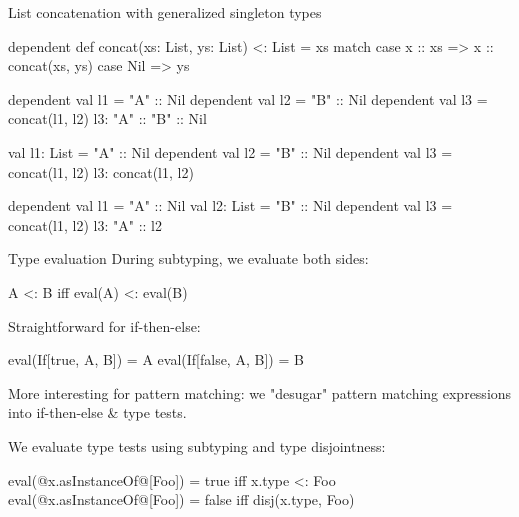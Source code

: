 \documentclass[10pt]{beamer}
\newenvironment{slide}[2][]
  {\begin{frame}[fragile,environment=slide,#1]{#2}}
  {\end{frame}}
\newcommand{\tp}{\color{typeColor}}
\begin{document}
\begin{slide}{List concatenation with generalized singleton types}
\begin{code}
dependent def concat(xs: List, ys: List) <: List =
  xs match
    case x :: xs => x :: concat(xs, ys)
    case Nil => ys
\end{code}
\pause
\begin{overprint}
\begin{code}
dependent val l1 = "A" :: Nil
dependent val l2 = "B" :: Nil
dependent val l3 = concat(l1, l2)
l3: { "A" :: "B" :: Nil }
\end{code}

\begin{code}
val l1: List     = "A" :: Nil
dependent val l2 = "B" :: Nil
dependent val l3 = concat(l1, l2)
l3: { concat(l1, l2) }
\end{code}

\begin{code}
dependent val l1 = "A" :: Nil
val l2: List     = "B" :: Nil
dependent val l3 = concat(l1, l2)
l3: { "A" :: l2 }
\end{code}

\end{overprint}
\end{slide}

\begin{slide}{Type evaluation}
During subtyping, we evaluate both sides:
\begin{code}
A <: B  iff  eval(A) <: eval(B)
\end{code}
\pause

Straightforward for if-then-else:
\begin{code}
eval(If[true, A, B]) = A
eval(If[false, A, B]) = B
\end{code}
\pause

More interesting for pattern matching: we "desugar" pattern matching expressions into if-then-else \& type tests.
\pause
\smallskip

We evaluate type tests using subtyping and type disjointness:
\begin{code}
eval(@\tp{}x.asInstanceOf@[Foo]) = true   iff  x.type <: Foo
eval(@\tp{}x.asInstanceOf@[Foo]) = false  iff  disj(x.type, Foo)
\end{code}
\end{slide}
\end{document}
